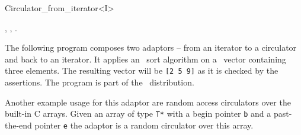 \begin{ccRefClass}{Circulator_from_iterator<I>}
\ccSeeAlso

,
,
.

\ccExample

The following program composes two adaptors -- from an iterator to a
circulator and back to an iterator. It applies an \stl\ sort algorithm
on a \stl\ vector containing three elements. The resulting vector will
be {\tt [2 5 9]} as it is checked by the assertions. The program is
part of the \cgal\ distribution.


Another example usage for this adaptor are random access circulators
over the built-in C arrays. Given an array of type {\tt T*}  with a
begin pointer {\tt b} and a past-the-end pointer {\tt e} the adaptor
 is a random circulator 
 over this array.

\end{ccRefClass}

